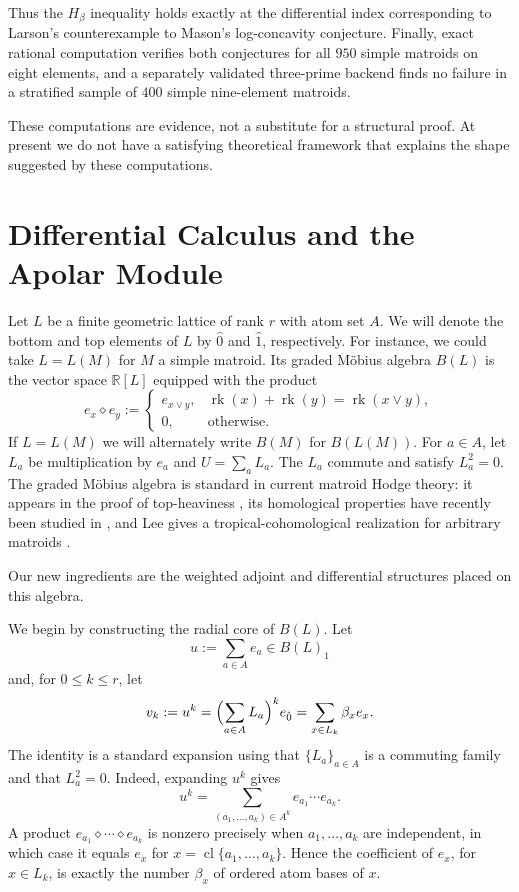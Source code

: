 \documentclass[11pt]{amsart}
\theoremstyle{definition}
\theoremstyle{remark}
\newcommand{\R}{\mathbb{R}}
\DeclareMathOperator{\rk}{rk}
\DeclareMathOperator{\cl}{cl}
\begin{document}
Thus the $H_\beta$ inequality holds exactly at the differential index corresponding to Larson's counterexample to Mason's log-concavity conjecture.  Finally, exact rational computation verifies both conjectures for all $950$ simple matroids on eight elements, and a separately validated three-prime backend finds no failure in a stratified sample of $400$ simple nine-element matroids.  

\medskip

These computations are evidence, not a substitute for a structural proof. At present we do not have a satisfying theoretical framework that explains the shape suggested by these computations.


\section{Differential Calculus and the Apolar Module}\label{sec:construction}

Let $L$ be a finite geometric lattice of rank $r$ with atom set $A$. We will denote the bottom and top elements of $L$ by $\hat 0$ and $\hat 1$, respectively. For instance, we could take $L = L(M)$ for $M$ a simple matroid. Its graded M\"obius algebra $B(L)$ is the vector space $\R[L]$ equipped with the product
\[
e_x\diamond e_y :=
\begin{cases}
e_{x\vee y},&\rk(x)+\rk(y)=\rk(x\vee y),\\
0,&\text{otherwise}.
\end{cases}
\]
If $L = L(M)$ we will alternately write $B(M)$ for $B(L(M))$.
For $a\in A$, let $L_a$ be multiplication by $e_a$ and $U=\sum_aL_a$.  The $L_a$ commute and satisfy $L_a^2=0$.
The graded M\"obius algebra is standard in current matroid Hodge theory: it appears in the proof of top-heaviness \cite{BHMPW}, its homological properties have recently been studied in \cite{LaClairMastroeniMcCulloughPeeva}, and Lee gives a tropical-cohomological realization for arbitrary matroids \cite{Lee}.  

\medskip

Our new ingredients are the weighted adjoint and differential structures placed on this algebra.

\medskip

We begin by constructing the radial core of $B(L)$. Let
\[
u:=\sum_{a\in A}e_a\in B(L)_1
\]
and, for $0\le k\le r$, let
\[
v_k:=u^k
=\Bigl(\sum_{a\in A}L_a\Bigr)^ke_{\hat 0} = \sum_{x\in L_k} \beta_x e_x.
\]
The identity is a standard expansion using that $\{L_a\}_{a\in A}$ is a commuting family and that $L_a^2=0$. Indeed, expanding $u^k$ gives
\[
u^k=\sum_{(a_1,\ldots,a_k)\in A^k}
e_{a_1}\cdots e_{a_k}.
\]
A product $e_{a_1}\diamond \dotsb \diamond e_{a_k}$ is nonzero precisely when
$a_1,\ldots,a_k$ are independent, in which case it equals
$e_x$ for $x={\cl\{a_1,\ldots,a_k\}}$.  Hence the coefficient of $e_x$, for
$x\in L_k$, is exactly the number $\beta_x$ of ordered atom bases
of $x$.
\end{document}
